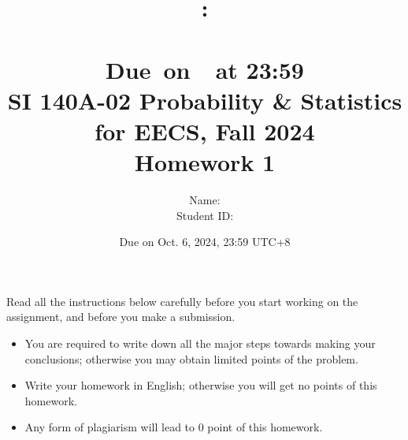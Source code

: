 \documentclass[a4paper]{article}
\title{
    \vspace{2in}
    \textmd{\textbf{\hmwkClass:\\  \hmwkTitle}}\\
    \normalsize\vspace{0.1in}\small{Due\ on\ \hmwkDueDate\ at 23:59}\\
	\vspace{4in}
}
\author{
	Name: \textbf{\hmwkAuthorName} \\
	Student ID: \hmwkAuthorID}
\date{}
\begin{document}

\date{
Due on Oct. 6, 2024, 23:59 UTC+8}
\title{SI 140A-02  Probability \& Statistics for EECS, Fall 2024 \\
Homework 1}
\maketitle
Read all the instructions below carefully before you start working on the assignment, and before you make a submission.
\begin{itemize}
    \item You are required to write down all the major steps towards making your conclusions; otherwise you may obtain limited points of the problem.
    \item Write your homework in English; otherwise you will get no points of this homework.
    \item Any form of plagiarism will lead to $0$ point of this homework. 
\end{itemize}
\newpage
\end{document}
